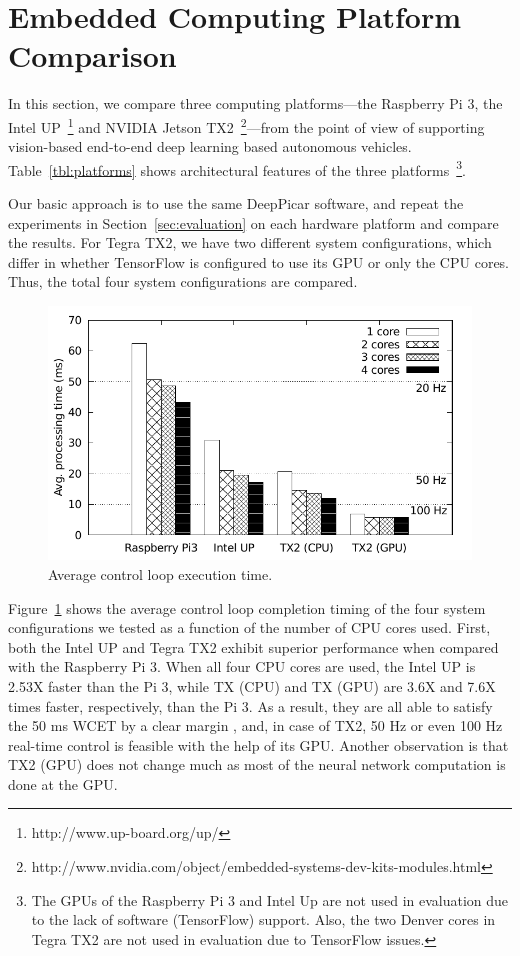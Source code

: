 
%

\section{Embedded Computing Platform Comparison}\label{sec:comparison}

In this section, we compare three computing platforms---the Raspberry
Pi 3, the Intel UP~\footnote{http://www.up-board.org/up/} and NVIDIA
Jetson
TX2~\footnote{http://www.nvidia.com/object/embedded-systems-dev-kits-modules.html}---from
the point of view of supporting vision-based end-to-end deep learning
based autonomous vehicles. 
Table~\ref{tbl:platforms} shows architectural features of the three
platforms~\footnote{The GPUs of the Raspberry Pi 3 and Intel
  Up are not used in evaluation due to the lack of software (TensorFlow)
support. Also, the two Denver cores in Tegra TX2 are not used in
evaluation due to TensorFlow issues.}.
  
Our basic approach is to use the same DeepPicar software, and repeat
the experiments in Section~\ref{sec:evaluation} on each hardware
platform and compare the results. 
For Tegra TX2, we have two different system configurations,
which differ in whether TensorFlow is configured to use its GPU or
only the CPU cores. Thus, the total four system configurations are
compared.

\begin{figure}[h]
  \centering
  \includegraphics[width=.45\textwidth]{figs/compare_core}
  \caption{Average control loop execution time.} 
  \label{fig:sys_core}
\end{figure}

Figure~\ref{fig:sys_core} shows the average control loop completion
timing of the four system configurations we tested as a function of
the number of CPU cores used.
First, both the Intel UP and Tegra TX2 exhibit superior performance when
compared with the Raspberry Pi 3. 
When all four CPU cores are used, the Intel UP is 2.53X faster than
the Pi 3, while TX (CPU) and TX (GPU) are 3.6X and 7.6X times faster,
respectively, than the Pi 3. 
As a result, they are all able to satisfy the 50 ms 
WCET by a clear margin
, and, in case of TX2, 50 Hz or even 100 Hz real-time control is
feasible with the help of its GPU. Another observation is that TX2
(GPU) does not change much as most of the neural network computation
is done at the GPU.

